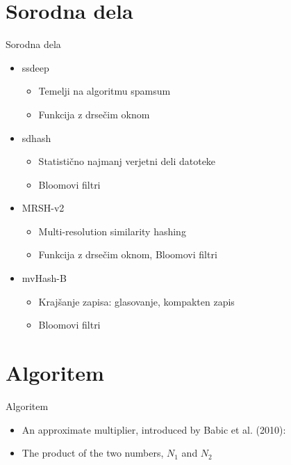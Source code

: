 \documentclass[xcolor=dvipsnames,compress]{beamer}
\begin{document}
\section{Sorodna dela}
\label{sec:sorodna}

\begin{frame}{Sorodna dela}
\begin{itemize}
	\item ssdeep
	\begin{itemize}
		\item Temelji na algoritmu spamsum
		\item Funkcija z drsečim oknom
	\end{itemize}
	\item sdhash
	\begin{itemize}
		\item Statistično najmanj verjetni deli datoteke
		\item Bloomovi filtri
	\end{itemize}
	\item MRSH-v2
	\begin{itemize}
		\item Multi-resolution similarity hashing
		\item Funkcija z drsečim oknom, Bloomovi filtri
	\end{itemize}
	\item mvHash-B
	\begin{itemize}
		\item Krajšanje zapisa: glasovanje, kompakten zapis
		\item Bloomovi filtri
	\end{itemize}
\end{itemize}
\end{frame}
%

\section{Algoritem}

\begin{frame}{Algoritem}
\begin{itemize}
    \item An approximate multiplier, introduced by Babic et al. (2010):
    \item The product of the two numbers, $N_{1}$ and $N_{2}$ 
\end{itemize}
\end{frame}
\end{document}
